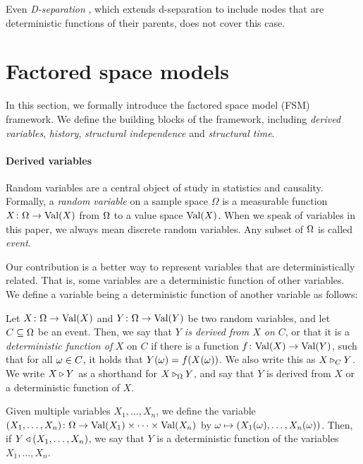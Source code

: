 \documentclass[USenglish,onecolumn]{article}
\begin{document}
Even \emph{D-separation} \cite{geiger1990identifying}, which extends d-separation to include nodes that are deterministic functions of their parents, does not cover this case.

\section{Factored space models}
\label{sec:fsm}
In this section, we formally introduce the factored space model (FSM) framework. We define the building blocks of the framework, including \emph{derived variables}, \textit{history}, \textit{structural independence} and \textit{structural time}.

\paragraph*{Derived variables}
Random variables are a central object of study in statistics and causality. Formally, a \emph{random variable} on a sample space $\Omega$ is a measurable function $X\colon\Omega \to \textnormal{Val}(X)$ from $\Omega$ to a value space $\textnormal{Val}(X)$. When we speak of variables in this paper, we always mean discrete random variables. Any subset of $\Omega$ is called \emph{event}.

Our contribution is a better way to represent variables that are deterministically related. That is, some variables are a deterministic function of other variables. We define a variable being a deterministic function of another variable  as follows:

\begin{definition}\label{def:derived}
  Let $X \colon  \Omega \to \textnormal{Val}(X)$ and $Y \colon  \Omega \to \textnormal{Val}(Y)$ be two random variables, and let $C\subseteq\Omega$ be an event. Then, we say that \emph{$Y$ is derived from $X$ on $C$}, or that it is a \emph{deterministic function of} $X$ on $C$ if there is a function $f\colon  \textnormal{Val}(X) \to \textnormal{Val}(Y)$, such that for all $\omega \in C$, it holds that $Y(\omega) = f(X(\omega))$. We also write this as $X \triangleright_C Y$. We write $X \triangleright Y$ as a shorthand for $X\triangleright_\Omega Y$, and say that $Y$ is derived from $X$ or a deterministic function of $X$.

\end{definition}

Given multiple variables $X_1, \dots, X_n$, we define the variable $(X_1,\dots, X_n)\colon  \Omega \to \textnormal{Val}(X_1)\times \dots\times\textnormal{Val}(X_n)$ by $\omega \mapsto (X_1(\omega), \dots, X_n(\omega))$. Then, if $Y\triangleleft (X_1, \dots, X_n)$, we say that $Y$ is a deterministic function of the variables $X_1, \dots, X_n$.
\end{document}
